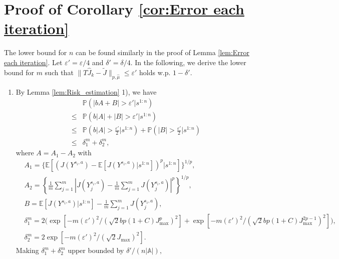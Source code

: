 \documentclass[12pt,technote,onecolumn]{IEEEtran}
\begin{document}
\section*{Proof of Corollary \ref{cor:Error each iteration}}
\begin{IEEEproof}
	The lower bound for $n$ can be found similarly in the proof of
	Lemma \ref{lem:Error each iteration}. Let $\varepsilon'=\varepsilon/4$
	and $\delta'=\delta/4.$ In the following, we derive the lower bound
	for $m$ such that $\|T\widehat{J}_{k}-\widetilde{J}\|_{p,\hat{\mu}}\leq\varepsilon'$
	holds w.p. $1-\delta'.$ 
	\begin{enumerate}
		\item By Lemma \ref{lem:Risk_estimation} 1), we have
		\begin{equation*}
		\begin{aligned}
		&\mathbb{P}\left(\left|bA+B\right|>\varepsilon'|s^{1:n}\right)\\
		\leq&\mathbb{P}\left(b\left|A\right|+\left|B\right|>\varepsilon'|s^{1:n}\right)\\
		\leq&\mathbb{P}\left(b\left|A\right|>\frac{\varepsilon'}{2}|s^{1:n}\right)+\mathbb{P}\left(\left|B\right|>\frac{\varepsilon'}{2}|s^{1:n}\right)\\
		\leq&\delta_{1}^{m}+\delta_{2}^{m},
		\end{aligned}
		\end{equation*}
		where $A=A_{1}-A_{2}$ with 
		\begin{equation*}
		\begin{aligned}
		&A_{1}=\{ \mathbb{E}[\left(J\left(Y^{s_{i},a}\right)-\mathbb{E}\left[J\left(Y^{s_{i},a}\right)|s^{1:n}\right]\right)^{p}|s^{1:n}]\} ^{1/p},\\
		&A_{2}=\left\{ \frac{1}{m}\sum_{j=1}^{m}\left|J\left(Y_{j}^{s_{i},a}\right)-\frac{1}{m}\sum_{j=1}^{m}J\left(Y_{j}^{s_{i},a}\right)\right|^{p}\right\} ^{1/p},\\
		&B=\mathbb{E}\left[J\left(Y^{s_{i},a}\right)|s^{1:n}\right]-\frac{1}{m}\sum_{j=1}^{m}J\left(Y_{j}^{s_{i},a}\right),\\
		&\delta_{1}^{m}=2\big(\exp[-m(\varepsilon')^{2}/(\sqrt{2}bp(1+C)J_{\max}^{p})^{2}]
		+\exp[-m(\varepsilon')^{2}/(\sqrt{2}bp(1+C)J_{\max}^{2p-1})^{2}]\big),\\
		&\delta_{2}^{m}=2\exp[-m(\varepsilon')^{2}/(\sqrt{2}J_{\max})^{2}].
		\end{aligned}
		\end{equation*}
		Making $\delta_{1}^{m}+\delta_{2}^{m}$ upper bounded by $\delta'/\left(n\left|\mathbb{A}\right|\right),$

\end{enumerate}
\end{IEEEproof}
\end{document}
